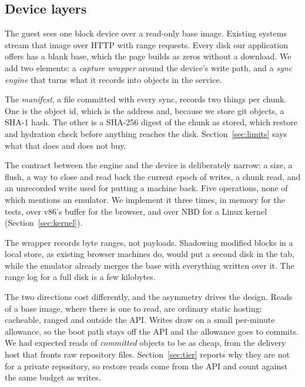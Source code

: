\documentclass[journal,10pt]{IEEEtran}
\begin{document}
\subsection{Device layers}

The guest sees one block device over a read-only base image. Existing systems
stream that image over HTTP with range requests. Every disk our application
offers has a blank base, which the page builds as zeros without a download. We add two
elements: a \emph{capture wrapper} around the device's write path, and a
\emph{sync engine} that turns what it records into objects in the service.

The \emph{manifest}, a file committed with every sync, records two things per
chunk. One is the object id, which is the address and, because we store git
objects, a SHA-1 hash. The other is a SHA-256 digest of the chunk as stored,
which restore and hydration check before anything reaches the disk.
Section~\ref{sec:limits} says what that does and does not buy.

The contract between the engine and the device is deliberately narrow: a size,
a flush, a way to close and read back the current epoch of writes, a chunk read,
and an unrecorded write used for putting a machine back. Five operations, none of
which mentions an emulator. We implement it three times, in memory for the tests,
over v86's buffer for the browser, and over NBD for a Linux kernel
(Section~\ref{sec:kernel}).

The wrapper records byte ranges, not payloads. Shadowing modified blocks in a
local store, as existing browser machines do, would put a second disk in the
tab, while the emulator already merges the base with everything written over
it. The range log for a full disk is a few kilobytes.

The two directions cost differently, and the asymmetry drives the design. Reads
of a base image, where there is one to read, are ordinary static hosting:
cacheable, ranged and outside the API. Writes draw on a small per-minute allowance, so the boot path stays off
the API and the allowance goes to commits. We had expected reads of
\emph{committed} objects to be as cheap, from the delivery host that fronts raw
repository files. Section~\ref{sec:tier} reports why they are not for a private
repository, so restore reads come from the API and count against the same budget
as writes.
\end{document}
